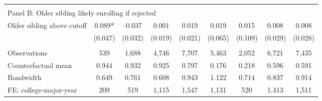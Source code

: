 {{\begin{tabular}{lcccccccc}
&  &  &  & & & & & &    \\
\multicolumn{9}{l}{Panel B: Older sibling likely enrolling if rejected} \\
Older sibling above cutoff&       0.089*  &      -0.037   &       0.001   &       0.019   &       0.019   &       0.015   &       0.008   &       0.008   \\
                    &     (0.047)   &     (0.032)   &     (0.019)   &     (0.021)   &     (0.065)   &     (0.109)   &     (0.029)   &     (0.028)   \\
                    &               &               &               &               &               &               &               &               \\
Observations        &         539   &       1,688   &       4,746   &       7,707   &       5,463   &       2,052   &       6,721   &       7,435   \\
Counterfactual mean &       0.944   &       0.932   &       0.925   &       0.797   &       0.176   &       0.218   &       0.596   &       0.591   \\
Bandwidth           &       0.649   &       0.761   &       0.608   &       0.943   &       1.122   &       0.714   &       0.837   &       0.914   \\
FE: college-major-year&         209   &         519   &       1,115   &       1,547   &       1,131   &         520   &       1,413   &       1,511   \\
 

\bottomrule
\end{tabular}
}
}
